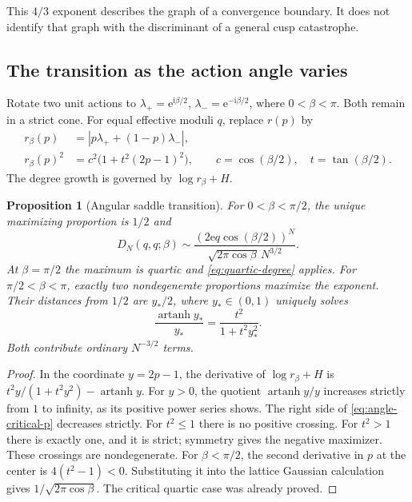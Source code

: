\documentclass[11pt,a4paper]{article}
\numberwithin{equation}{section}
\newtheorem{proposition}[theorem]{Proposition}
\theoremstyle{definition}
\theoremstyle{remark}
\newcommand{\ii}{\mathrm i}
\newcommand{\e}{\mathrm e}
\begin{document}
This $4/3$ exponent describes the graph of a convergence boundary. It
does not identify that graph with the discriminant of a general cusp
catastrophe.

\subsection{The transition as the action angle varies}

Rotate two unit actions to $\lambda_+=\e^{\ii\beta/2}$,
$\lambda_-=\e^{-\ii\beta/2}$, where $0<\beta<\pi$. Both remain in a
strict cone. For equal effective moduli $q$, replace $r(p)$ by
\begin{equation}\label{eq:rbeta}
 \begin{aligned}
 r_\beta(p)&=|p\lambda_++(1-p)\lambda_-|,\\
 r_\beta(p)^2&=c^2\bigl(1+t^2(2p-1)^2\bigr),
 \qquad c=\cos(\beta/2),\quad t=\tan(\beta/2).
 \end{aligned}
\end{equation}
The degree growth is governed by $\log r_\beta+H$.

\begin{proposition}[Angular saddle transition]\label{prop:angle-transition}
For $0<\beta<\pi/2$, the unique maximizing proportion is $1/2$ and
\begin{equation}\label{eq:subcritical-angle}
 D_N(q,q;\beta)\sim
 \frac{(2\e q\cos(\beta/2))^N}{\sqrt{2\pi\cos\beta}\,N^{3/2}}.
\end{equation}
At $\beta=\pi/2$ the maximum is quartic and
\eqref{eq:quartic-degree} applies. For $\pi/2<\beta<\pi$, exactly
two nondegenerate proportions maximize the exponent. Their distances
from $1/2$ are $y_*/2$, where $y_*\in(0,1)$ uniquely solves
\begin{equation}\label{eq:angle-critical-p}
 \frac{\operatorname{artanh}y_*}{y_*}=
 \frac{t^2}{1+t^2y_*^2}.
\end{equation}
Both contribute ordinary $N^{-3/2}$ terms.
\end{proposition}

\begin{proof}
In the coordinate $y=2p-1$, the derivative of $\log r_\beta+H$ is
$t^2y/(1+t^2y^2)-\operatorname{artanh}y$.
For $y>0$, the quotient $\operatorname{artanh}y/y$ increases strictly
from $1$ to infinity, as its positive power series shows. The right
side of \eqref{eq:angle-critical-p} decreases strictly.
For $t^2\le1$ there is no positive crossing. For $t^2>1$ there is
exactly one, and it is strict; symmetry gives the negative maximizer.
These crossings are nondegenerate. For $\beta<\pi/2$, the second
derivative in $p$ at the center is $4(t^2-1)<0$. Substituting it into
the lattice Gaussian calculation gives
$1/\sqrt{2\pi\cos\beta}$. The critical quartic case was already proved.
\end{proof}
\end{document}
